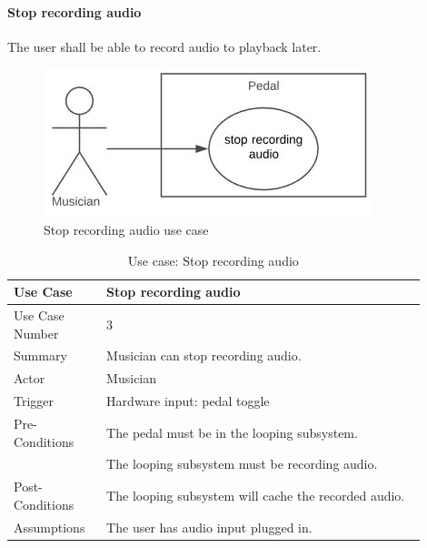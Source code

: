         \paragraph{Stop recording audio} 
            The user shall be able to record audio to playback later.
            \begin{figure}[!ht]
                \centering
                \includegraphics[width=.5\textwidth]{diagrams/use_cases/uc-record-stop.JPG}
                \caption{Stop recording audio use case}
                \label{fig:uc-record-stop }
            \end{figure}
            
            \begin{table}[!ht]
                \centering
                \begin{tabular}{| p{0.2\linewidth} | p{0.7\linewidth} |}
                    \hline
                    Use Case & Stop recording audio  \\
                    \hline \hline
                    Use Case Number & 3 \\ \hline
                    Summary & Musician can stop recording audio. \\ \hline
                    Actor & Musician \\ \hline
                    Trigger & Hardware input: pedal toggle \\ \hline
                    Pre-Conditions & The pedal must be in the looping subsystem. \\
                    & The looping subsystem must be recording audio. \\ \hline
                    Post-Conditions & The looping subsystem will cache the recorded audio. \\ \hline
                    Assumptions & The user has audio input plugged in.\\ \hline
                \end{tabular}
                \\
                \caption{Use case: Stop recording audio}
                \label{tab:uc-record-stop}
            \end{table}
 
